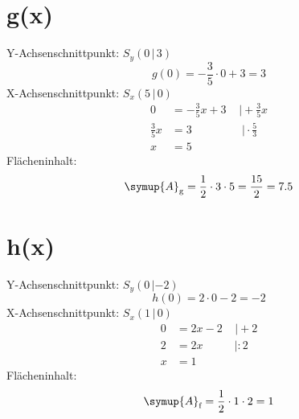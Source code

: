       \section*{g(x)}
      Y-Achsenschnittpunkt: $S_y (0\,|\,3)$
      \begin{equation}
            g(0)=-\frac{3}{5}\cdot 0+3=3
      \end{equation}
      X-Achsenschnittpunkt: $S_x (5\,|\,0)$
      \begin{align}
            0&=-\frac{3}{5}x+3\;\;\;\;|\!+\!\frac{3}{5}x\\
            \frac{3}{5}x&=3\;\;\;\;\;\;\;\;\;\;\;\;\;\;\;\;|\!\cdot\!\frac{5}{3}\\
            x&=5
      \end{align}
      Flächeninhalt:
      \begin{equation}
            \symup{A}_\text{g} = \frac{1}{2}\cdot3\cdot5=\frac{15}{2}=7.5
      \end{equation}

      \section*{h(x)}
      Y-Achsenschnittpunkt: $S_y (0\,|-2)$
      \begin{equation}
            h(0)=2\cdot 0-2=-2
      \end{equation}
      X-Achsenschnittpunkt: $S_x (1\,|\,0)$
      \begin{align}
            0&=2x-2\;\;\;\;|\!+\!2\\
            2&=2x\;\;\;\;\;\;\;\;\;\;|\!:\!2\\
            x&=1
      \end{align}
      Flächeninhalt:
      \begin{equation}
            \symup{A}_\text{f} = \frac{1}{2}\cdot1\cdot2=1 
      \end{equation}

